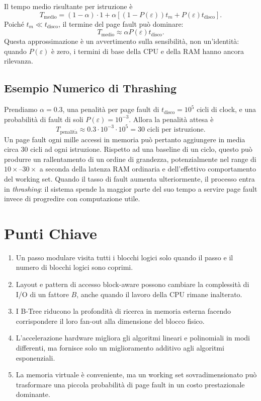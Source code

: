 Il tempo medio risultante per istruzione è
\[
  T_{\mathrm{medio}}=(1-\alpha)\cdot1
  +\alpha\left[(1-P(\varepsilon))t_m
  +P(\varepsilon)t_{\mathrm{disco}}\right].
\]
Poiché $t_m\ll t_{\mathrm{disco}}$, il termine del page fault può dominare:
\[
  T_{\mathrm{medio}}\approx
  \alpha P(\varepsilon)t_{\mathrm{disco}}.
\]
Questa approssimazione è un avvertimento sulla sensibilità, non un'identità: quando $P(\varepsilon)$ è zero, i termini di base della CPU e della RAM hanno ancora rilevanza.

\subsection{Esempio Numerico di Thrashing}
\label{subsec:thrashing}

Prendiamo $\alpha=0.3$, una penalità per page fault di $t_{\mathrm{disco}}=10^5$ cicli di clock, e una probabilità di fault di soli $P(\varepsilon)=10^{-3}$. Allora la penalità attesa è
\[
  T_{\mathrm{penalit\grave{a}}}
  \approx 0.3\cdot10^{-3}\cdot10^5
  =30\text{ cicli per istruzione}.
\]
Un page fault ogni mille accessi in memoria può pertanto aggiungere in media circa $30$ cicli ad ogni istruzione. Rispetto ad una baseline di un ciclo, questo può produrre un rallentamento di un ordine di grandezza, potenzialmente nel range di $10\times$--$30\times$ a seconda della latenza RAM ordinaria e dell'effettivo comportamento del working set. Quando il tasso di fault aumenta ulteriormente, il processo entra in \emph{thrashing}: il sistema spende la maggior parte del suo tempo a servire page fault invece di progredire con computazione utile.

\section{Punti Chiave}
\label{sec:lecture-two-takeaways}

\begin{enumerate}
  \item Un passo modulare visita tutti i blocchi logici solo quando il passo e il numero di blocchi logici sono coprimi.
  \item Layout e pattern di accesso block-aware possono cambiare la complessità di I/O di un fattore $B$, anche quando il lavoro della CPU rimane inalterato.
  \item I B-Tree riducono la profondità di ricerca in memoria esterna facendo corrispondere il loro fan-out alla dimensione del blocco fisico.
  \item L'accelerazione hardware migliora gli algoritmi lineari e polinomiali in modi differenti, ma fornisce solo un miglioramento additivo agli algoritmi esponenziali.
  \item La memoria virtuale è conveniente, ma un working set sovradimensionato può trasformare una piccola probabilità di page fault in un costo prestazionale dominante.
\end{enumerate}

